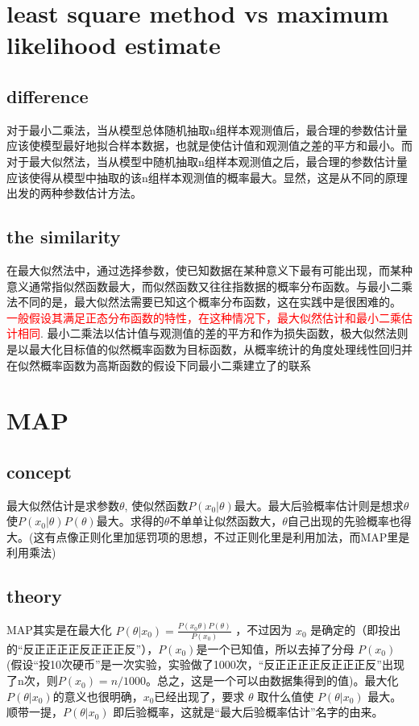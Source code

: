 \documentclass[12pt]{ctexart}%
\begin{document}
	\section{\quad least square method vs maximum likelihood estimate}
		\subsection{\quad difference}
			对于最小二乘法，当从模型总体随机抽取n组样本观测值后，最合理的参数估计量应该使模型最好地拟合样本数据，也就是使估计值和观测值之差的平方和最小。而对于最大似然法，当从模型中随机抽取n组样本观测值之后，最合理的参数估计量应该使得从模型中抽取的该n组样本观测值的概率最大。显然，这是从不同的原理出发的两种参数估计方法。
			
		\subsection{\quad the similarity}
			在最大似然法中，通过选择参数，使已知数据在某种意义下最有可能出现，而某种意义通常指似然函数最大，而似然函数又往往指数据的概率分布函数。与最小二乘法不同的是，最大似然法需要已知这个概率分布函数，这在实践中是很困难的。
			\textcolor{red}{一般假设其满足正态分布函数的特性，在这种情况下，最大似然估计和最小二乘估计相同}. 最小二乘法以估计值与观测值的差的平方和作为损失函数，极大似然法则是以最大化目标值的似然概率函数为目标函数，从概率统计的角度处理线性回归并在似然概率函数为高斯函数的假设下同最小二乘建立了的联系
		
	\section{\quad MAP}
		\subsection{\quad concept}
			最大似然估计是求参数$\theta$, 使似然函数$P(x_0|\theta)$最大。最大后验概率估计则是想求$\theta$使$P(x_0|\theta)P(\theta)$最大。求得的$\theta$不单单让似然函数大，$\theta$自己出现的先验概率也得大。(这有点像正则化里加惩罚项的思想，不过正则化里是利用加法，而MAP里是利用乘法)
		
		\subsection{\quad theory}
			MAP其实是在最大化
			$P(\theta|x_0)=\frac{P(x_0 \theta) P(\theta)}{P(x_0)}$
			，不过因为 $x_0$ 是确定的（即投出的“反正正正正反正正正反”），$P(x_0)$是一个已知值，所以去掉了分母 $P(x_0)$ (假设“投10次硬币”是一次实验，实验做了1000次，“反正正正正反正正正反”出现了n次，则$P(x_0)=n/1000$。总之，这是一个可以由数据集得到的值)。最大化$P(\theta|x_0)$的意义也很明确，$x_0$已经出现了，要求 $\theta$ 取什么值使 $P(\theta|x_0)$ 最大。顺带一提，$P(\theta|x_0)$ 即后验概率，这就是“最大后验概率估计”名字的由来。
\end{document}
